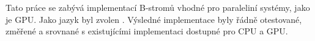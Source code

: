 Tato práce se zabývá implementací B-stromů vhodné pro paraleliní systémy, jako je GPU. Jako jazyk byl zvolen \CC. Výsledné implementace byly řádně otestované, změřené a srovnané s existujícími implementaci dostupné pro CPU a GPU.